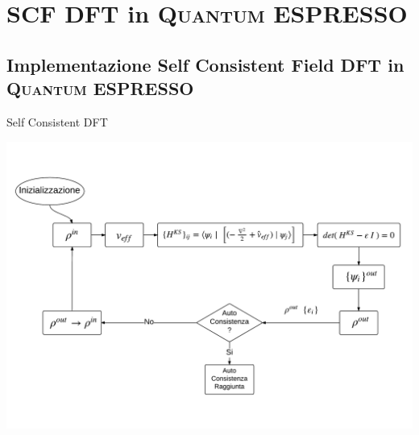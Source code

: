 \documentclass[8pt]{beamer}
\newcommand\QE{\textsc{Quantum} ESPRESSO }
\begin{document}
\section{SCF DFT in \QE}
\subsection{Implementazione Self Consistent Field DFT in \QE}
\begin{frame}{Self Consistent DFT}
\begin{center}
	\includegraphics[width=\textwidth]{beam_SCF_0.pdf}	
\end{center}
\end{frame}



\def \inputPos {3}
\def \electronsPos {4}
\def \cegtergPos {5}
\def \hpsiPos {6}
\def \cdiaghgPos {7}
\def \sumbandPos {8}
\def \fftPos {9}
\def \fftscatterPos {10}
\def \scfPicWidth {1.1}
\def \scfPicHeight {0.62}
\end{document}
